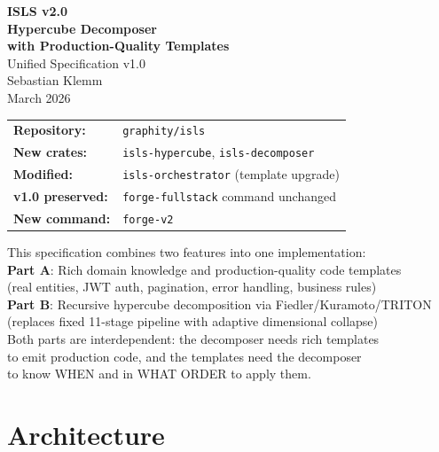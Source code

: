\documentclass[11pt,a4paper]{article}
\begin{document}
\begin{titlepage}
\begin{center}
\vspace*{1.5cm}
{\Huge\bfseries ISLS v2.0}\\[0.4cm]
{\LARGE\bfseries Hypercube Decomposer}\\[0.3cm]
{\LARGE\bfseries with Production-Quality Templates}\\[1.2cm]
{\Large Unified Specification v1.0}\\[1.5cm]
{\large Sebastian Klemm}\\[0.3cm]
{\small March 2026}\\[2cm]

\begin{tabular}{ll}
\textbf{Repository:} & \texttt{graphity/isls} \\
\textbf{New crates:} & \texttt{isls-hypercube}, \texttt{isls-decomposer} \\
\textbf{Modified:} & \texttt{isls-orchestrator} (template upgrade) \\
\textbf{v1.0 preserved:} & \texttt{forge-fullstack} command unchanged \\
\textbf{New command:} & \texttt{forge-v2} \\
\end{tabular}

\vfill
{\small
This specification combines two features into one implementation:\\[0.2cm]
\textbf{Part A}: Rich domain knowledge and production-quality code templates\\
(real entities, JWT auth, pagination, error handling, business rules)\\[0.2cm]
\textbf{Part B}: Recursive hypercube decomposition via Fiedler/Kuramoto/TRITON\\
(replaces fixed 11-stage pipeline with adaptive dimensional collapse)\\[0.4cm]
Both parts are interdependent: the decomposer needs rich templates\\
to emit production code, and the templates need the decomposer\\
to know WHEN and in WHAT ORDER to apply them.
}
\end{center}
\end{titlepage}

\tableofcontents
\newpage

\part{Architecture}
\end{document}
